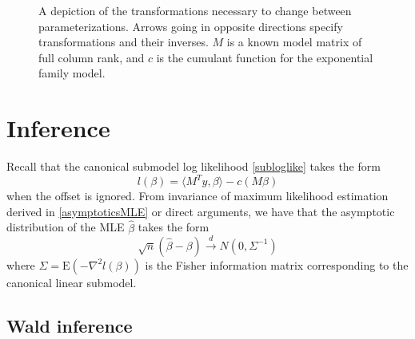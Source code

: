 \documentclass[12pt]{article}
\newcommand{\E}{\mathrm{E}}
\newcommand{\inner}[1]{\langle #1 \rangle}
\DeclareMathOperator{\E}{E}
\begin{document}
\begin{figure}[t]
\begin{center}
\end{center}
\caption{A depiction of the transformations necessary to change between parameterizations. Arrows going in opposite directions specify transformations and their inverses. $M$ is a known model matrix of full column rank, and $c$ is the cumulant function for the exponential family model.}\label{Fig1:parameterizations}
\end{figure}

\section*{Inference}

Recall that the canonical submodel log likelihood \eqref{subloglike} takes the form
$$
	l(\beta) = \inner{M^Ty,\beta} - c(M\beta)
$$
when the offset is ignored. From invariance of maximum likelihood estimation derived in \eqref{asymptoticsMLE} or direct arguments, we have that the asymptotic distribution of the MLE $\hat\beta$ takes the form
$$
  \sqrt{n}\left(\hat\beta - \beta\right) \overset{d}{\to} N(0, \Sigma^{-1})
$$
where $\Sigma = \E\left(-\nabla^2 l(\beta)\right)$ is the Fisher information matrix corresponding to the canonical linear submodel.


\subsection*{Wald inference}
\end{document}
